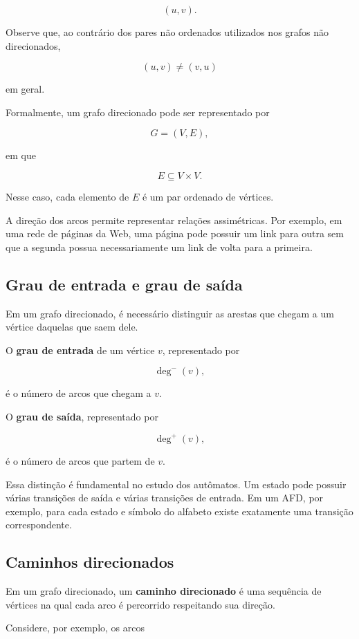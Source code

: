 \documentclass[
  brazilian,
  letterpaper,
]{book}
\theoremstyle{plain}
\theoremstyle{definition}
\theoremstyle{remark}
\begin{document}
\[
(u,v).
\]

Observe que, ao contrário dos pares não ordenados utilizados nos grafos
não direcionados,

\[
(u,v)\neq(v,u)
\]

em geral.

Formalmente, um grafo direcionado pode ser representado por

\[
G=(V,E),
\]

em que

\[
E\subseteq V\times V.
\]

Nesse caso, cada elemento de \(E\) é um par ordenado de vértices.

A direção dos arcos permite representar relações assimétricas. Por
exemplo, em uma rede de páginas da Web, uma página pode possuir um link
para outra sem que a segunda possua necessariamente um link de volta
para a primeira.

\subsection{Grau de entrada e grau de
saída}\label{grau-de-entrada-e-grau-de-sauxedda}

Em um grafo direcionado, é necessário distinguir as arestas que chegam a
um vértice daquelas que saem dele.

O \textbf{grau de entrada} de um vértice \(v\), representado por

\[
\deg^-(v),
\]

é o número de arcos que chegam a \(v\).

O \textbf{grau de saída}, representado por

\[
\deg^+(v),
\]

é o número de arcos que partem de \(v\).

Essa distinção é fundamental no estudo dos autômatos. Um estado pode
possuir várias transições de saída e várias transições de entrada. Em um
AFD, por exemplo, para cada estado e símbolo do alfabeto existe
exatamente uma transição correspondente.

\subsection{Caminhos direcionados}\label{caminhos-direcionados}

Em um grafo direcionado, um \textbf{caminho direcionado} é uma sequência
de vértices na qual cada arco é percorrido respeitando sua direção.

Considere, por exemplo, os arcos
\end{document}
